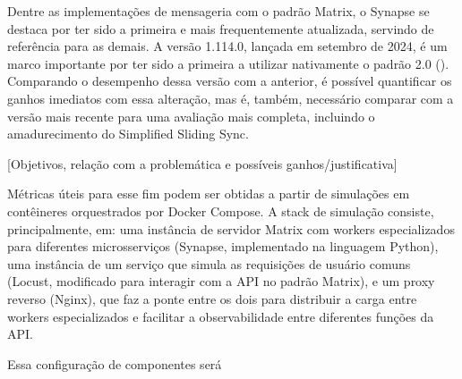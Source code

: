 Dentre as implementações de mensageria com o padrão Matrix, o Synapse se destaca por ter sido a primeira e mais frequentemente atualizada, servindo de referência para as demais. A versão 1.114.0, lançada em setembro de 2024, é um marco importante por ter sido a primeira a utilizar nativamente o padrão 2.0 (). Comparando o desempenho dessa versão com a anterior, é possível quantificar os ganhos imediatos com essa alteração, mas é, também, necessário comparar com a versão mais recente para uma avaliação mais completa, incluindo o amadurecimento do Simplified Sliding Sync.

[Objetivos, relação com a problemática e possíveis ganhos/justificativa]

Métricas úteis para esse fim podem ser obtidas a partir de simulações em contêineres orquestrados por Docker Compose. A stack de simulação consiste, principalmente, em: uma instância de servidor Matrix com workers especializados para diferentes microsserviços (Synapse, implementado na linguagem Python), uma instância de um serviço que simula as requisições de usuário comuns (Locust, modificado para interagir com a API no padrão Matrix), e um proxy reverso (Nginx), que faz a ponte entre os dois para distribuir a carga entre workers especializados e facilitar a observabilidade entre diferentes funções da API.

Essa configuração de componentes será 

